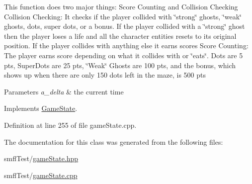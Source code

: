This function does two major things\+: Score Counting and Collision Checking Collision Checking\+: It checks if the player collided with \char`\"{}strong\char`\"{} ghosts, \char`\"{}weak\char`\"{} ghosts, dots, super dots, or a bonus. If the player collided with a \char`\"{}strong\char`\"{} ghost then the player loses a life and all the character entities resets to its original position. If the player collides with anything else it earns scores Score Counting\+: The player earns score depending on what it collides with or \char`\"{}eats\char`\"{}. Dots are 5 pts, Super\+Dots are 25 pts, \char`\"{}\+Weak\char`\"{} Ghosts are 100 pts, and the bonus, which shows up when there are only 150 dots left in the maze, is 500 pts


\begin{DoxyParams}{Parameters}
{\em a\+\_\+delta} & the current time \\
\hline
\end{DoxyParams}


Implements \hyperlink{class_game_state_ab1fe4312f7ce88e7dc11f9935dee67d1}{Game\+State}.



Definition at line 255 of file game\+State.\+cpp.



The documentation for this class was generated from the following files\+:\begin{DoxyCompactItemize}
\item 
smfl\+Test/\hyperlink{game_state_8hpp}{game\+State.\+hpp}\item 
smfl\+Test/\hyperlink{game_state_8cpp}{game\+State.\+cpp}\end{DoxyCompactItemize}
